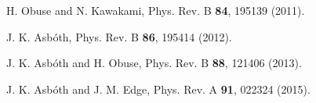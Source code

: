 \documentclass[twocolumn,amsmath, amssymb, superscriptaddress, pra]{revtex4}
\begin{document}
\begin{thebibliography}{99}
 H. Obuse and N. Kawakami, Phys. Rev. B \textbf{84}, 195139
    (2011).

 J. K. Asb\'oth, Phys. Rev. B \textbf{86}, 195414 (2012).

 J. K. Asb\'oth and H. Obuse, Phys. Rev. B \textbf{88}, 121406
    (2013).

 J. K. Asb\'oth and J. M. Edge, Phys. Rev. A \textbf{91},
    022324
    (2015).

\end{thebibliography}
\end{document}
